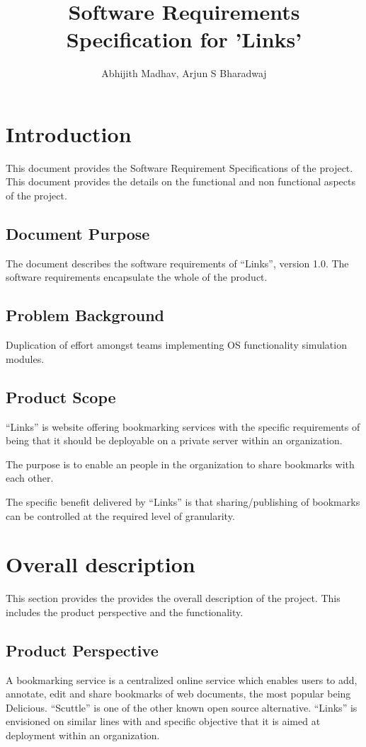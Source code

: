 \documentclass[11pt]{report} %
\title{Software Requirements Specification for 'Links'}
\author{Abhijith Madhav, Arjun S Bharadwaj}
\begin{document}
\maketitle
\chapter{Introduction}
This document provides the Software Requirement Specifications of the project. This document provides the details on the functional and non functional aspects of the project.
\section{Document Purpose}
The document describes the software requirements of “Links”, version 1.0. The software requirements encapsulate the whole of the product.

\section{Problem Background }
Duplication of effort amongst teams implementing OS functionality simulation modules.

\section{Product Scope}
“Links” is website offering bookmarking services with the specific requirements of being that it should be deployable on a private server within an organization.

The purpose is to enable an people in the organization to share bookmarks with each other.

The specific benefit delivered by “Links” is that sharing/publishing of bookmarks can be controlled at the required level of granularity.


\maketitle
\chapter{Overall description}
This section provides the provides the overall description of the project. This includes the product perspective and the functionality.
\section{Product Perspective}
A bookmarking service is a centralized online service which enables users to add, annotate, edit and share bookmarks of web documents, the most popular being Delicious. “Scuttle” is one of the other known open source alternative. “Links” is envisioned on similar lines with and specific objective that it is aimed at deployment within an organization.
\end{document}
